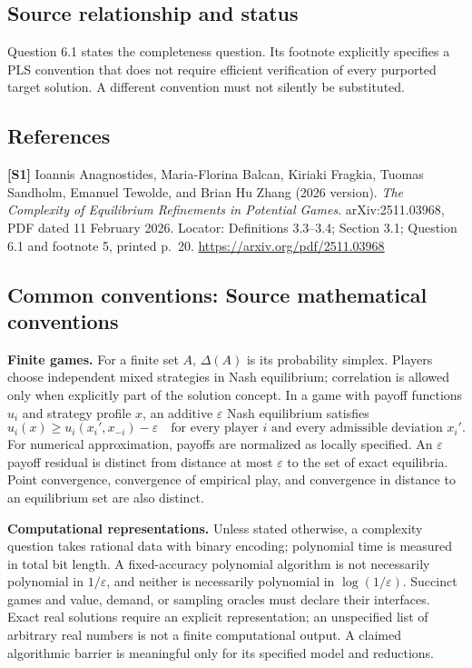 \documentclass[11pt,a4paper]{article}
\begin{document}
\subsection*{Source relationship and status}
Question 6.1 states the completeness question. Its footnote explicitly specifies a PLS convention that does not require efficient verification of every purported target solution. A different convention must not silently be substituted.
\subsection*{References}
\begingroup\footnotesize\raggedright
{\footnotesize\raggedright
\textbf{[S1]} Ioannis Anagnostides, Maria-Florina Balcan, Kiriaki Fragkia, Tuomas Sandholm, Emanuel Tewolde, and Brian Hu Zhang (2026 version). \emph{The Complexity of Equilibrium Refinements in Potential Games}. arXiv:2511.03968, PDF dated 11 February 2026. Locator: Definitions 3.3--3.4; Section 3.1; Question 6.1 and footnote 5, printed p.\ 20. \url{https://arxiv.org/pdf/2511.03968}\par}
\par\endgroup

\subsection*{Common conventions: Source mathematical conventions}

\textbf{Finite games.} For a finite set $A$, $\Delta(A)$ is its probability
simplex. Players choose independent mixed strategies in Nash equilibrium;
correlation is allowed only when explicitly part of the solution concept.
In a game with payoff functions $u_i$ and strategy profile $x$, an additive
$\varepsilon$ Nash equilibrium satisfies
\[
 u_i(x)\geq u_i(x_i',x_{-i})-\varepsilon
 \quad\text{for every player $i$ and every admissible deviation $x_i'$}.
\]
For numerical approximation, payoffs are normalized as locally specified.
An $\varepsilon$ payoff residual is distinct from distance at most
$\varepsilon$ to the set of exact equilibria. Point convergence, convergence
of empirical play, and convergence in distance to an equilibrium set are
also distinct.

\textbf{Computational representations.} Unless stated otherwise, a complexity
question takes rational data with binary encoding; polynomial time is measured
in total bit length. A fixed-accuracy polynomial algorithm is not necessarily
polynomial in $1/\varepsilon$, and neither is necessarily polynomial in
$\log(1/\varepsilon)$. Succinct games and value, demand, or sampling oracles
must declare their interfaces. Exact real solutions require an explicit
representation; an unspecified list of arbitrary real numbers is not a
finite computational output. A claimed algorithmic barrier is meaningful
only for its specified model and reductions.
\end{document}
